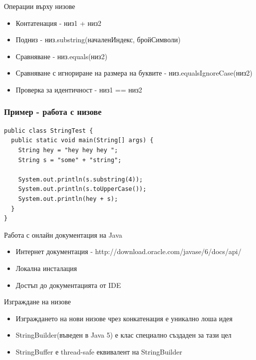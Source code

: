 \documentclass{beamer}
\begin{document}
\begin{frame}{Операции върху низове}
  \transdissolve
  \begin{itemize}
  \item Контатенация - низ1 + низ2 \pause
  \item Подниз - низ.substring(началенИндекс, бройСимволи) \pause
  \item Сравняване - низ.equals(низ2) \pause
  \item Сравняване с игнориране на размера на буквите -
    низ.equalsIgnoreCase(низ2) \pause
  \item Проверка за идентичност - низ1 == низ2
  \end{itemize}
\end{frame}

\begin{frame}[fragile]
  \frametitle{Пример - работа с низове}
  \transdissolve
\begin{lstlisting}
public class StringTest {
  public static void main(String[] args) {
    String hey = "hey hey hey ";
    String s = "some" + "string";

    System.out.println(s.substring(4));
    System.out.println(s.toUpperCase());
    System.out.println(hey + s);
  }
}  
\end{lstlisting}
\end{frame}

\begin{frame}{Работа с онлайн документация на Java}
  \transdissolve
  \begin{itemize}
  \item Интернет документация -
    http://download.oracle.com/javase/6/docs/api/ \pause
  \item Локална инсталация \pause
  \item Достъп до документацията от IDE \pause
  \end{itemize}
\end{frame}

\begin{frame}{Изграждане на низове}
  \transdissolve
  \begin{itemize}
  \item Изграждането на нови низове чрез конкатенация е уникално лоша
    идея \pause
  \item StringBuilder(въведен в Java 5) е клас специално създаден за
    тази цел \pause
  \item StringBuffer е thread-safe еквивалент на StringBuilder
  \end{itemize}
\end{frame}
\end{document}

